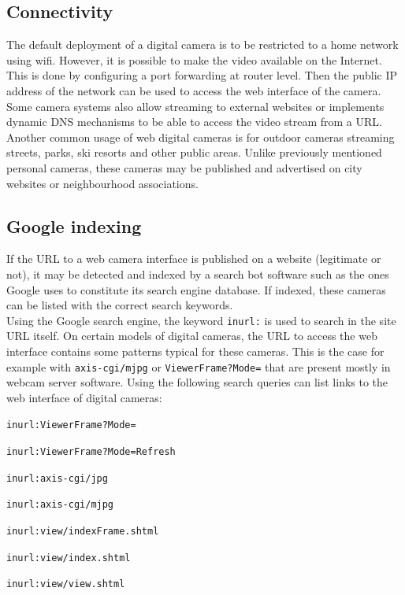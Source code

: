 \subsection{Connectivity}
\label{sec:cam-connect}

The default deployment of a digital camera is to be restricted to a home network using wifi.
However, it is possible to make the video available on the Internet.
This is done by configuring a port forwarding at router level.
Then the public IP address of the network can be used to access the web interface of the camera.
Some camera systems also allow streaming to external websites or implements dynamic DNS mechanisms to be able to access the video stream from a URL.\\

Another common usage of web digital cameras is for outdoor cameras streaming streets, parks, ski resorts and other public areas.
Unlike previously mentioned personal cameras, these cameras may be published and advertised on city websites or neighbourhood associations.

\subsection{Google indexing}

If the URL to a web camera interface is published on a website (legitimate or not), it may be detected and indexed by a search bot software such as the ones Google uses to constitute its search engine database.
If indexed, these cameras can be listed with the correct search keywords.\\

Using the Google search engine, the keyword \texttt{inurl:} is used to search in the site URL itself.
On certain models of digital cameras, the URL to access the web interface contains some patterns typical for these cameras.
This is the case for example with \texttt{axis-cgi/mjpg} or \texttt{ViewerFrame?Mode=} that are present mostly in webcam server software.
Using the following search queries can list links to the web interface of digital cameras:

\begin{itemizealt}
\item \texttt{inurl:ViewerFrame?Mode=}
\item \texttt{inurl:ViewerFrame?Mode=Refresh}
\item \texttt{inurl:axis-cgi/jpg}
\item \texttt{inurl:axis-cgi/mjpg}
\item \texttt{inurl:view/indexFrame.shtml}
\item \texttt{inurl:view/index.shtml}
\item \texttt{inurl:view/view.shtml}
\end{itemizealt}

